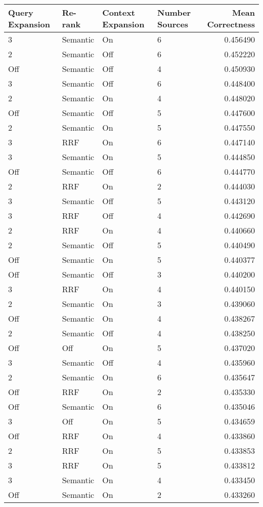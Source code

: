 \begin{tabular}{llllr}
\toprule
Query Expansion & Re-rank & Context Expansion & Number Sources & Mean Correctness \\
\midrule
3 & Semantic & On & 6 & 0.456490 \\
2 & Semantic & Off & 6 & 0.452220 \\
Off & Semantic & Off & 4 & 0.450930 \\
3 & Semantic & Off & 6 & 0.448400 \\
2 & Semantic & On & 4 & 0.448020 \\
Off & Semantic & Off & 5 & 0.447600 \\
2 & Semantic & On & 5 & 0.447550 \\
3 & RRF & On & 6 & 0.447140 \\
3 & Semantic & On & 5 & 0.444850 \\
Off & Semantic & Off & 6 & 0.444770 \\
2 & RRF & On & 2 & 0.444030 \\
3 & Semantic & Off & 5 & 0.443120 \\
3 & RRF & Off & 4 & 0.442690 \\
2 & RRF & On & 4 & 0.440660 \\
2 & Semantic & Off & 5 & 0.440490 \\
Off & Semantic & On & 5 & 0.440377 \\
Off & Semantic & Off & 3 & 0.440200 \\
3 & RRF & On & 4 & 0.440150 \\
2 & Semantic & On & 3 & 0.439060 \\
Off & Semantic & On & 4 & 0.438267 \\
2 & Semantic & Off & 4 & 0.438250 \\
Off & Off & On & 5 & 0.437020 \\
3 & Semantic & Off & 4 & 0.435960 \\
2 & Semantic & On & 6 & 0.435647 \\
Off & RRF & On & 2 & 0.435330 \\
Off & Semantic & On & 6 & 0.435046 \\
3 & Off & On & 5 & 0.434659 \\
Off & RRF & On & 4 & 0.433860 \\
2 & RRF & On & 5 & 0.433853 \\
3 & RRF & On & 5 & 0.433812 \\
3 & Semantic & On & 4 & 0.433450 \\
Off & Semantic & On & 2 & 0.433260 \\

\end{tabular}
